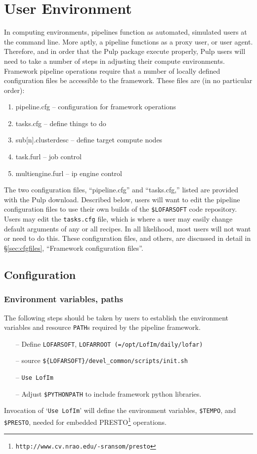 \documentclass[a4paper,10pt,bibtotoc]{scrartcl}
\begin{document}
\section{User Environment}
\label{sec:environment}
In computing environments, pipelines function as automated, simulated
users at the command line.  More aptly, a pipeline
functions as a proxy user, or user agent. Therefore, and in order
that the Pulp package execute properly, Pulp users will need to take a
number of steps in adjusting their compute environments. Framework
pipeline operations require that a number of locally defined
configuration files be accessible to the framework. These files are
(in no particular order):
\begin{enumerate}
\item pipeline.cfg            -- configuration for framework operations
\item tasks.cfg                -- define things to do
\item sub[n].clusterdesc -- define target compute nodes
\item task.furl                 -- job control
\item multiengine.furl     -- ip engine control
\end{enumerate}
The two configuration files, ``pipeline.cfg'' and ``tasks.cfg,''
listed are provided with the Pulp download.  Described below,
users will want to edit the pipeline configuration files to use their
own builds of the \verb|$LOFARSOFT| code repository.  Users may edit the
\verb|tasks.cfg| file, which is where a user may easily change default
arguments of any or all recipes.  In all likelihood, most users will
not want or need to do this. These configuration files, and others,
are discussed in detail in \S\ref{sec:cfgfiles}, ``Framework configuration files''.

\subsection{Configuration}
\label{sec:config}
\subsubsection{Environment variables, paths}

The following steps should be taken by users to establish the
environment variables and resource \verb|PATH|s required by the pipeline framework. 
\begin{itemize}
\item[--] Define \verb|LOFARSOFT|, \verb|LOFARROOT (=/opt/LofIm/daily/lofar)|
\item [--]source \verb|${LOFARSOFT}/devel_common/scripts/init.sh|
\item [--]\verb|Use LofIm|
\item[--] Adjust \verb|$PYTHONPATH| to include framework python
  libraries.
\end{itemize}
Invocation of `\verb|Use LofIm|' will define the environment variables, \verb|$TEMPO|,
and \verb|$PRESTO|, needed for embedded
PRESTO\footnote{\texttt{http://www.cv.nrao.edu/-sransom/presto}} operations.
\end{document}
